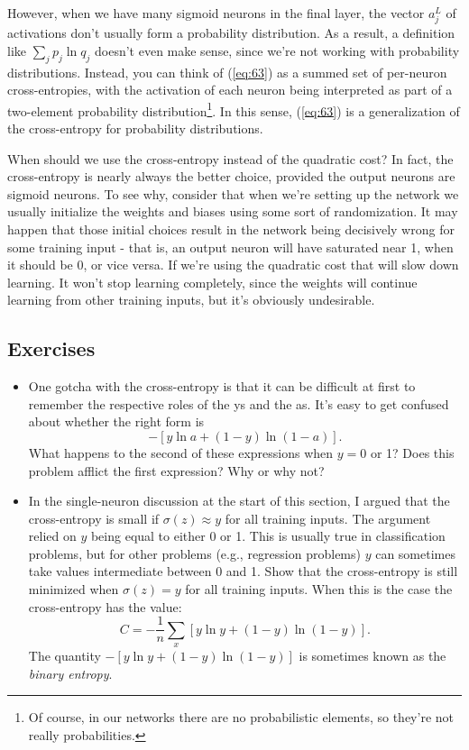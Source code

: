 \documentclass[a4paper,twoside,10pt]{book}
\begin{document}
However, when we have many sigmoid neurons in the final layer, the vector $a^L_j$ of activations don't usually form a probability distribution. As a result, a definition like $\sum_j p_j \ln q_j$ doesn't even make sense, since we're not working with probability distributions. Instead, you can think of (\ref{eq:63}) as a summed set of per-neuron cross-entropies, with the activation of each neuron being interpreted as part of a two-element probability distribution\footnote{Of course, in our networks there are no probabilistic elements, so they're not really probabilities.}. In this sense, (\ref{eq:63}) is a generalization of the cross-entropy for probability distributions.

When should we use the cross-entropy instead of the quadratic cost? In fact, the cross-entropy is nearly always the better choice, provided the output neurons are sigmoid neurons. To see why, consider that when we're setting up the network we usually initialize the weights and biases using some sort of randomization. It may happen that those initial choices result in the network being decisively wrong for some training input - that is, an output neuron will have saturated near 1, when it should be 0, or vice versa. If we're using the quadratic cost that will slow down learning. It won't stop learning completely, since the weights will continue learning from other training inputs, but it's obviously undesirable.

\subsection*{Exercises}
\begin{itemize}
	\item One gotcha with the cross-entropy is that it can be difficult at first to remember the respective roles of the ys and the as. It's easy to get confused about whether the right form is $$-[y \ln a + (1-y) \ln (1-a)].$$ What happens to the second of these expressions when $y=0$ or 1? Does this problem afflict the first expression? Why or why not?
	\item In the single-neuron discussion at the start of this section, I argued that the cross-entropy is small if $\sigma(z)\approx y$ for all training inputs. The argument relied on $y$ being equal to either 0 or 1. This is usually true in classification problems, but for other problems (e.g., regression problems) $y$ can sometimes take values intermediate between 0 and 1. Show that the cross-entropy is still minimized when $\sigma(z)=y$ for all training inputs. When this is the case the cross-entropy has the value:
	\begin{equation}
		C = -\frac{1}{n} \sum_x [y \ln y+(1-y) \ln(1-y)].
		\label{eq:64}
	\end{equation}
	The quantity $-[y \ln y+(1-y) \ln(1-y)]$ is sometimes known as the \textit{binary entropy}.
\end{itemize}
\end{document}
